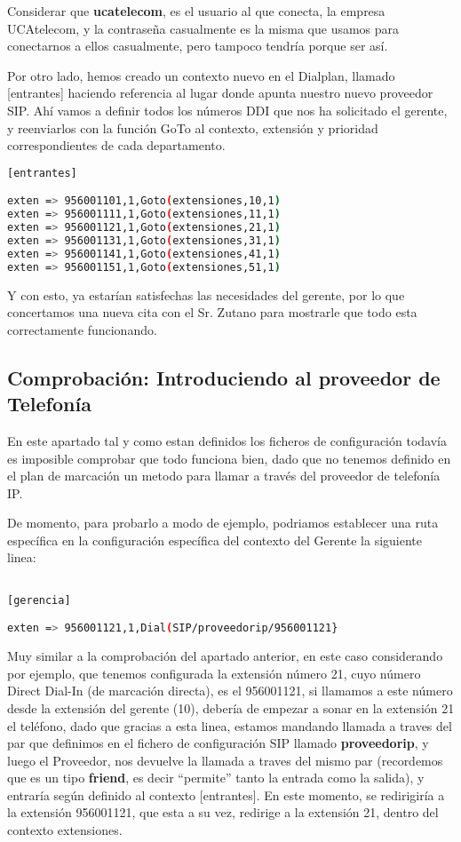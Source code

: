 Considerar que \textbf{ucatelecom}, es el usuario al que conecta, la empresa UCAtelecom, y la contraseña casualmente es la misma que usamos para conectarnos a ellos casualmente, pero tampoco tendría porque ser así.

Por otro lado, hemos creado un contexto nuevo en el Dialplan, llamado [entrantes] haciendo referencia al lugar donde apunta nuestro nuevo proveedor SIP. Ahí vamos a definir todos los números DDI que nos ha solicitado el gerente, y reenviarlos con la función GoTo al contexto, extensión y prioridad correspondientes de cada departamento.

\begin{lstlisting}[language=bash,title={/etc/asterisk/extensions.conf}]
[entrantes]

exten => 956001101,1,Goto(extensiones,10,1)
exten => 956001111,1,Goto(extensiones,11,1)
exten => 956001121,1,Goto(extensiones,21,1)
exten => 956001131,1,Goto(extensiones,31,1)
exten => 956001141,1,Goto(extensiones,41,1)
exten => 956001151,1,Goto(extensiones,51,1)
\end{lstlisting}

Y con esto, ya estarían satisfechas las necesidades del gerente, por lo que concertamos una nueva cita con el Sr. Zutano para mostrarle que todo esta correctamente funcionando.

\subsection{Comprobación: Introduciendo al proveedor de Telefonía}

En este apartado tal y como estan definidos los ficheros de configuración todavía es imposible comprobar que todo funciona bien, dado que no tenemos definido en el plan de marcación un metodo para llamar a través del proveedor de telefonía IP. 

De momento, para probarlo a modo de ejemplo, podriamos establecer una ruta específica en la configuración específica del contexto del Gerente la siguiente linea:

\begin{lstlisting}[language=bash,title={/etc/asterisk/extensions.conf}]

[gerencia]

exten => 956001121,1,Dial(SIP/proveedorip/956001121}

\end{lstlisting}

Muy similar a la comprobación del apartado anterior, en este caso considerando por ejemplo, que tenemos configurada la extensión número 21, cuyo número Direct Dial-In (de marcación directa), es el 956001121, si llamamos a este número desde la extensión del gerente (10), debería de empezar a sonar en la extensión 21 el teléfono, dado que gracias a esta linea, estamos mandando llamada a traves del par que definimos en el fichero de configuración SIP llamado \textbf{proveedorip}, y luego el Proveedor, nos devuelve la llamada a traves del mismo par (recordemos que es un tipo \textbf{friend}, es decir ``permite'' tanto la entrada como la salida), y entraría según definido al contexto [entrantes]. En este momento, se redirigiría a la extensión 956001121, que esta a su vez, redirige a la extensión 21, dentro del contexto extensiones.